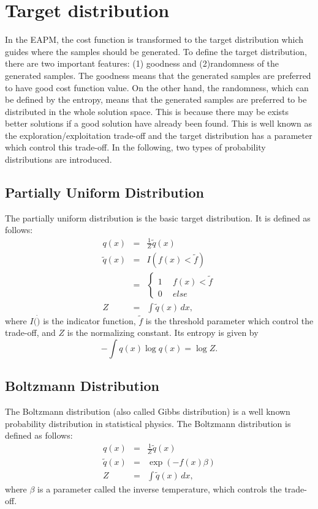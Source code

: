 \section{Target distribution}
In the EAPM, the cost function is transformed to
the target distribution which guides where the samples should be generated.
To define the target distribution,
there are two important features:
(1) goodness and (2)randomness of the generated samples.
The goodness means that 
the generated samples are preferred to have good cost function
value. 
On the other hand, the randomness, which can be defined by the entropy,
means that the generated samples are preferred to be distributed in the whole
solution space.
This is because 
there may be exists better solutions if a good solution have already 
been found.
This is well known as the exploration/exploitation trade-off and
the target distribution has a parameter which control this trade-off.
In the following, two types of probability distributions are introduced.


\subsection{Partially Uniform Distribution}
The partially uniform distribution is the basic target distribution.
It is defined as follows:
\begin{eqnarray}
 q(x) &=& \frac{1}{Z}\tilde q(x) \label{pud} \\
\tilde q(x)
&=& I(f(x)<\tilde f) \nonumber \\
&=& \left\{
  \begin{array}{rl}
    1 & ~~f(x)<\tilde f \\
    0 & ~~else
  \end{array} \right.
 \label{truncation}
 \\
 Z &=& \int \tilde q(x) \, dx ,
\label{constant}
\end{eqnarray}
where 
$I(\dot)$ is the indicator function,
$\tilde f$ is the threshold parameter which control the trade-off, and
$Z$ is the normalizing constant.
Its entropy is given by
\begin{equation}
 -\int q(x) \log q(x) = \log Z.
\end{equation}


\subsection{Boltzmann Distribution}
The Boltzmann distribution (also called Gibbs distribution) is
a well known probability distribution in statistical physics.
The Boltzmann distribution is defined as follows:
\begin{eqnarray}
  q(x) &=& \frac{1}{Z}\tilde q(x) \\
 \tilde q(x) &=& \exp(-f(x)\beta) \\
 Z &=& \int \tilde q(x) \, dx ,
\end{eqnarray}
where $\beta$ is a parameter called the inverse temperature,
which controls the trade-off.

